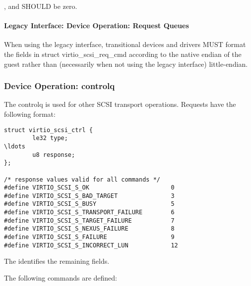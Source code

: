 
,  and  SHOULD be zero.

\paragraph{Legacy Interface: Device Operation: Request Queues}\label{sec:Device Types / SCSI Host Device / Device Operation / Device Operation: Request Queues / Legacy Interface: Device Operation: Request Queues}
When using the legacy interface, transitional devices and drivers
MUST format the fields in struct virtio_scsi_req_cmd
according to the native endian of the guest rather than
(necessarily when not using the legacy interface) little-endian.

\subsubsection{Device Operation: controlq}\label{sec:Device Types / SCSI Host Device / Device Operation / Device Operation: controlq}

The controlq is used for other SCSI transport operations.
Requests have the following format:

\begin{lstlisting}
struct virtio_scsi_ctrl {
        le32 type;
\ldots
        u8 response;
};

/* response values valid for all commands */
#define VIRTIO_SCSI_S_OK                       0
#define VIRTIO_SCSI_S_BAD_TARGET               3
#define VIRTIO_SCSI_S_BUSY                     5
#define VIRTIO_SCSI_S_TRANSPORT_FAILURE        6
#define VIRTIO_SCSI_S_TARGET_FAILURE           7
#define VIRTIO_SCSI_S_NEXUS_FAILURE            8
#define VIRTIO_SCSI_S_FAILURE                  9
#define VIRTIO_SCSI_S_INCORRECT_LUN            12
\end{lstlisting}

The  identifies the remaining fields.

The following commands are defined:

